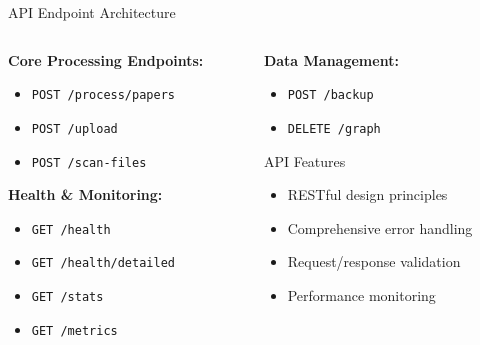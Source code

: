 \documentclass[aspectratio=169]{beamer}
\begin{document}
\begin{frame}{API Endpoint Architecture}
    \begin{columns}[c]
        \begin{column}{0.5\textwidth}
            \textbf{Core Processing Endpoints:}
            \begin{itemize}
                \item \texttt{POST /process/papers}
                \item \texttt{POST /upload}
                \item \texttt{POST /scan-files}
            \end{itemize}
            
            \vspace{0.3cm}
            
            \textbf{Health \& Monitoring:}
            \begin{itemize}
                \item \texttt{GET /health}
                \item \texttt{GET /health/detailed}
                \item \texttt{GET /stats}
                \item \texttt{GET /metrics}
            \end{itemize}
        \end{column}
        \begin{column}{0.5\textwidth}
            \textbf{Data Management:}
            \begin{itemize}
                \item \texttt{POST /backup}
                \item \texttt{DELETE /graph}
            \end{itemize}
            
            \vspace{0.3cm}
            
            \begin{alertblock}{API Features}
                \begin{itemize}
                    \item RESTful design principles
                    \item Comprehensive error handling
                    \item Request/response validation
                    \item Performance monitoring
                \end{itemize}
            \end{alertblock}
        \end{column}
    \end{columns}
\end{frame}
\end{document}
